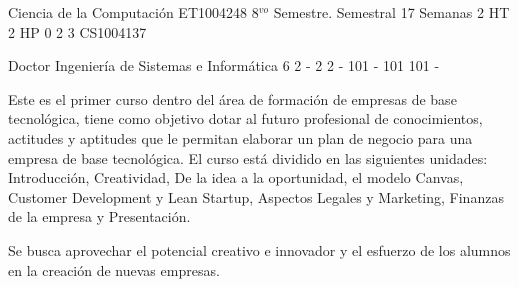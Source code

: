\documentclass[a4paper,8pt]{article}
\begin{document}
\setNombreProfesor{}
\setGradoProfesorAbreviado{}
\sylabusHeader

\academicaTable
{Ciencia de la Computación} %
{ET1004248} %
{8$^{vo}$ Semestre.} %
{Semestral} %
{17 Semanas} %
{2 HT} %
{2 HP} %
{0} %
{}  %
{2} %
{3} %
{CS1004137} %

\administrativaTable
{Doctor} %
{Ingeniería de Sistemas e Informática} %
{6} %
{2} %
{-} %
{2} %
{2} %
{-} %
{101} %
{-} %
{101} %
{101} %
{-} %


\begin{fundamentacion}
Este es el primer curso dentro del área de formación de empresas de
base tecnológica, tiene como objetivo dotar al futuro profesional 
de conocimientos, actitudes y aptitudes que le
permitan elaborar un plan de negocio para una empresa de base tecnológica.
El curso está dividido en las siguientes unidades:
Introducción, Creatividad, De la idea a la oportunidad, el modelo Canvas, Customer Development y Lean Startup, Aspectos Legales y Marketing, Finanzas de la empresa y Presentación.

Se busca aprovechar el potencial creativo e innovador y el esfuerzo de los alumnos en la creación de nuevas empresas.

\end{fundamentacion}

\begin{sumilla}
\item 
\item 
\item 
\item 
\item 
\item 
\item 
\item 

\end{sumilla}
\end{document}
